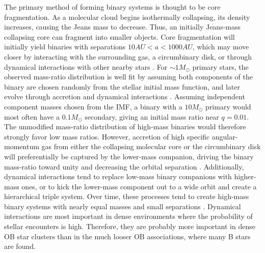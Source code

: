 The primary method of forming binary systems is thought to be core fragmentation. As a molecular cloud
begins isothermally collapsing, its density increases, causing the
Jeans mass to decrease. Thus, an initially Jeans-mass collapsing core
can fragment into smaller objects. Core fragmentation will initially yield binaries with separations
$10 AU < a < 1000 AU$, which may move closer by interacting
with the surrounding gas, a circumbinary disk, or through dynamical
interactions with other nearby stars \citep{BBB2002}. For $\sim 1
M_{\odot}$ primary stars, the observed mass-ratio distribution is well fit by assuming
both components of the binary are chosen randomly from the stellar
initial mass function, and later evolve through
accretion and dynamical interactions \citep{Kroupa2003}. Assuming
independent component masses chosen from the IMF, a binary with a $10 M_{\odot}$ primary would
most often have a $0.1 M_{\odot}$ secondary, giving an initial mass
ratio near $q=0.01$. The unmodified mass-ratio distribution of
high-mass binaries would therefore strongly favor low mass
ratios. However, accretion of high specific angular-momentum gas
from either the collapsing molecular core or
the circumbinary disk will preferentially be captured by the
lower-mass companion, driving the binary mass-ratio toward unity and
decreasing the orbital separation
\citep{Bate2000, BonnellBate2005}. Additionally, dynamical
interactions tend to replace low-mass binary companions with higher-mass ones, or to kick the lower-mass component out to a wide orbit and create a hierarchical triple system. Over time, these processes tend to create high-mass binary systems 
with nearly equal masses and small separations \citep{BBB2002}. Dynamical interactions are most important in dense environments where the probability of stellar encounters is high. Therefore, they are probably more important in dense OB star clusters than in the much looser OB associations, where many B stars are found.

